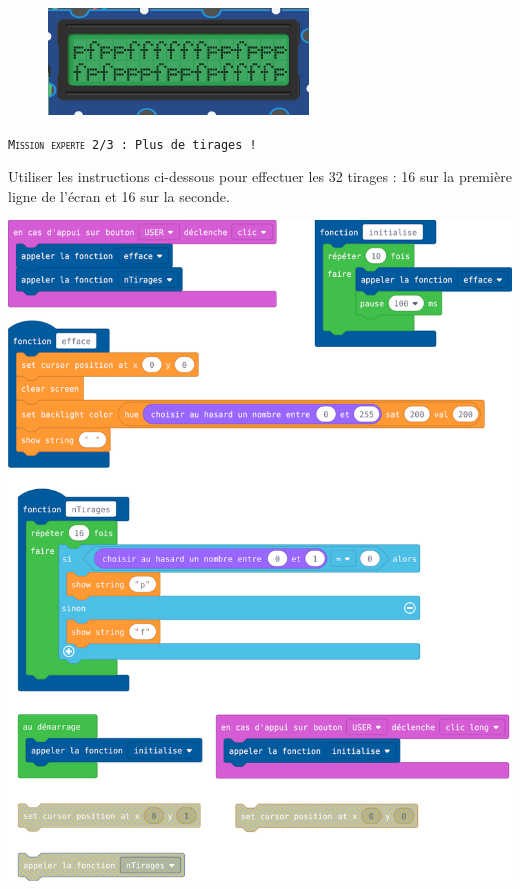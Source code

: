 

%
%
\begin{figure}
    \includegraphics[width=\linewidth]{res/st-pf-04.png}
\end{figure}

\begin{eleve}	
	\texttt{\textsc{Mission experte 2/3} : Plus de tirages !}
	
	Utiliser les instructions ci-dessous pour effectuer les 32 tirages : 16 sur la première ligne de l'écran et 16 sur la seconde.
	
    \centerline{\includegraphics[width=0.6\linewidth]{res/st-pf-04-eleve.png}}
\end{eleve}

\newpage

